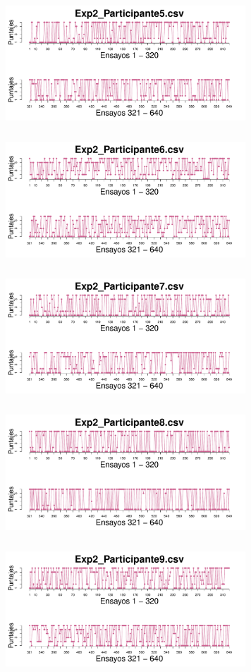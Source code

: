 \documentclass[a4paper ]{article}
\begin{document}
\begin{figure}[th]
\includegraphics[width=9cm, height=5cm]{Figures/Rating_Exp2_P5} \includegraphics[width=9cm, height=5cm]{Figures/Rating_Exp2_P6}
\includegraphics[width=9cm, height=5cm]{Figures/Rating_Exp2_P7} \includegraphics[width=9cm, height=5cm]{Figures/Rating_Exp2_P8} 
\includegraphics[width=9cm, height=5cm]{Figures/Rating_Exp2_P9}
\end{figure}
\end{document}
